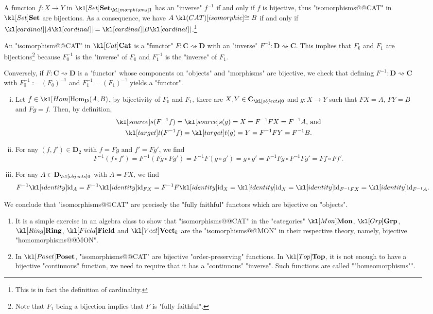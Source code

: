 \documentclass[main.tex]{subfiles}
\begin{document}
\begin{exmp}[$\catSet$]
	A function $f: X \rightarrow Y$ in $\mor{\catSet}$ has an "inverse" $f^{-1}$ if and only if $f$ is bijective, thus "isomorphisms@@CAT" in $\catSet$ are bijections. As a consequence, we have $A \isoCAT B$ if and only if $\cardinal{A} = \cardinal{B}$.\footnote{This is in fact the definition of cardinality.}
\end{exmp}
\begin{exmp}[$\catCat$]
	An "isomorphism@@CAT" in $\catCat$ is a "functor" $F:\mathbf{C} \rightsquigarrow \mathbf{D}$ with an "inverse" $F^{-1}: \mathbf{D} \rightsquigarrow \mathbf{C}$. This implies that $F_0$ and $F_1$ are bijections\footnote{Note that $F_1$ being a bijection implies that $F$ is "fully faithful".} because $F_0^{-1}$ is the "inverse" of $F_0$ and $F_1^{-1}$ is the "inverse" of $F_1$. %

	Conversely, if $F:\mathbf{C} \rightsquigarrow \mathbf{D}$ is a "functor" whose components on "objects" and "morphisms" are bijective, we check that defining $F^{-1}: \mathbf{D} \rightsquigarrow \mathbf{C}$ with $F_0^{-1} := (F_0)^{-1}$ and $F_1^{-1}= (F_1)^{-1}$ yields a "functor".
	\begin{enumerate}[i.]
		\item Let $f\in \Hom_{\mathbf{D}}(A,B)$, by bijectivity of $F_0$ and $F_1$, there are $X,Y \in \obj{\mathbf{C}}$ and $g:X \rightarrow Y$ such that $FX = A$, $FY = B$ and $Fg = f$. Then, by definition,
		\begin{gather*}
			\source( F^{-1}f ) = \source(g) = X = F^{-1}FX = F^{-1} A\text{, and}\\
			\target( F^{-1}f ) = \target(g) = Y = F^{-1}FY = F^{-1} B.
		\end{gather*}
		\item For any $(f,f') \in \mathbf{D}_2$ with $f = Fg$ and $f' = Fg'$, we find \[F^{-1}(f \circ f') = F^{-1}(Fg \circ Fg') = F^{-1}F(g \circ g') = g \circ g' = F^{-1}Fg \circ F^{-1}Fg' = Ff \circ Ff'.\]
		\item For any $A \in \obj{\mathbf{D}}$ with $A = FX$, we find
		\[F^{-1}\id_A = F^{-1}\id_{FX} = F^{-1}F\id_X = \id_X = \id_{F^{-1}FX} = \id_{F^{-1}A}.\]
	\end{enumerate}
	We conclude that "isomorphisms@@CAT" are precisely the "fully faithful" functors which are bijective on "objects".
\end{exmp}
\begin{exmps}
	\begin{enumerate}
		\item It is a simple exercise in an algebra class to show that "isomorphisms@@CAT" in the "categories" $\catMon$, $\catGrp$, $\catRing$, $\catField$ and $\catVect{k}$ are the "isomorphisms@@MON" in their respective theory, namely, bijective "homomorphisms@@MON".
		\item In $\catPoset$, "isomorphisms@@CAT" are bijective "order-preserving" functions.
		\itemAP In $\catTop$, it is not enough to have a bijective "continuous" function, we need to require that it has a "continuous" "inverse". Such functions are called ""homeomorphisms"". %
	\end{enumerate}
\end{exmps}
\end{document}
